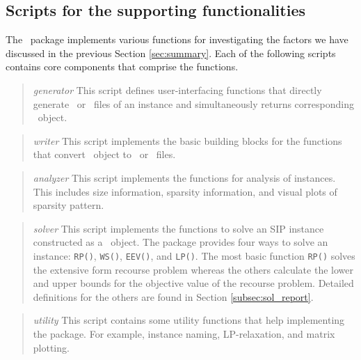\subsection{Scripts for the supporting functionalities}
The \siplibtwo\ package implements various functions for investigating the factors we have discussed in the previous Section \ref{sec:summary}. Each of the following scripts contains core components that comprise the functions.
\begin{quotation}
	\noindent\textit{generator} This script defines user-interfacing functions that directly generate \smps\ or \mps\ files of an instance and simultaneously returns corresponding \jumpmodel\ object.
\end{quotation}

\begin{quotation}
	\noindent\textit{writer} This script implements the basic building blocks for the functions that convert \jumpmodel\ object to \smps\ or \mps\ files. 
\end{quotation}

\begin{quotation}
	\noindent\textit{analyzer} This script implements the functions for analysis of instances. This includes size information, sparsity information, and visual plots of sparsity pattern.
\end{quotation}

\begin{quotation}
	\noindent\textit{solver} This script implements the functions to solve an SIP instance constructed as a \jumpmodel\ object. The package provides four ways to solve an instance: \texttt{RP()}, \texttt{WS()}, \texttt{EEV()}, and \texttt{LP()}. The most basic function \texttt{RP()} solves the extensive form recourse problem whereas the others calculate the lower and upper bounds for the objective value of the recourse problem. Detailed definitions for the others are found in Section \ref{subsec:sol_report}.
\end{quotation}

\begin{quotation}
	\noindent\textit{utility} This script contains some utility functions that help implementing the package. For example, instance naming, LP-relaxation, and matrix plotting.
\end{quotation}




